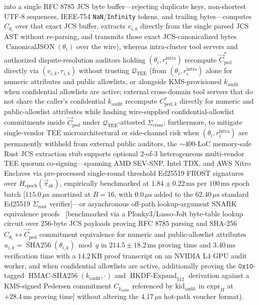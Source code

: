 \documentclass[conference,10pt]{IEEEtran}
\begin{document}
\begin{itemize}
into a single RFC 8785 JCS byte buffer---rejecting duplicate keys, non-shortest UTF-8 sequences, IEEE-754 \texttt{NaN}/\texttt{Infinity} tokens, and trailing bytes---computes $C_{\theta_i}$ over that exact JCS buffer, extracts $v_{i,k}$ directly from the single parsed JCS AST without re-parsing, and transmits those exact JCS-canonicalized bytes $\operatorname{CanonicalJSON}(\theta_i)$ over the wire), whereas intra-cluster tool servers and authorized dispute-resolution auditors holding $(\theta_i, r_i^{\text{intra}})$ recompute $\vec{C}_{\text{ped}}^*$ directly via $(v_{i,k}, r_{i,k})$ without trusting $\mathcal{Q}_{\text{TEE}}$ (from $(\theta_i, r_i^{\text{intra}})$ alone for numeric attributes and public allowlists, or alongside KMS-provisioned $k_{\text{audit}}$ when confidential allowlists are active; external cross-domain tool servers that do not share the caller's confidential $k_{\text{audit}}$ recompute $C_{\text{ped}, k}^*$ directly for numeric and public-allowlist attributes while hashing wire-supplied confidential-allowlist commitments inside $\vec{C}_{\text{ped}}$ under $\mathcal{Q}_{\text{TEE}}$-attested $\Sigma_{\text{cross}}$; furthermore, to mitigate single-vendor TEE microarchitectural or side-channel risk when $(\theta_i, r_i^{\text{intra}})$ are permanently withheld from external public auditors, the $\sim 400$-LoC memory-safe Rust JCS extraction stub supports optional $2$-of-$3$ heterogeneous multi-vendor TEE quorum co-signing---spanning AMD SEV-SNP, Intel TDX, and AWS Nitro Enclaves via pre-processed single-round threshold Ed25519 FROST signatures~\cite{komlo2020frost} over $H_{\text{epoch}}(\vec{\pi}_{\text{zk}})$, empirically benchmarked at $1.84 \pm 0.22\,\text{ms}$ per $100\,\text{ms}$ epoch batch [$115.0\,\mu\text{s}$ amortized at $B=16$, with $0.0\,\mu\text{s}$ added to the $62.40\,\mu\text{s}$ standard Ed25519 $\Sigma_{\text{root}}$ verifier]---or asynchronous off-path lookup-argument SNARK equivalence proofs~\cite{setty2024jolt} [benchmarked via a Plonky3/Lasso-Jolt byte-table lookup circuit over $256$-byte JCS payloads proving RFC 8785 parsing and SHA-256 $C_{\theta_i} \leftrightarrow \vec{C}_{\text{ped}}$ commitment equivalence for numeric and public-allowlist attributes $u_{i,k} = \operatorname{SHA256}(\theta_{i,k}) \bmod q$ in $214.5 \pm 18.2\,\text{ms}$ proving time and $3.40\,\text{ms}$ verification time with a $14.2\,\text{KB}$ proof transcript on an NVIDIA L4 GPU audit worker, and when confidential allowlists are active, additionally proving the $\mathtt{0x10}$-tagged $\operatorname{HMAC-SHA256}(k_{\text{audit}}, \cdot)$ and $\operatorname{HKDF-Expand}_{512}$ derivation against a KMS-signed Pedersen commitment $C_{k_{\text{audit}}}$ referenced by $\text{kid}_{\text{audit}}$ in $\text{expr}_{\Pi}$ at $+28.4\,\text{ms}$ proving time] without altering the $4.17\,\mu\text{s}$ hot-path voucher format).
\end{itemize}
\end{document}
